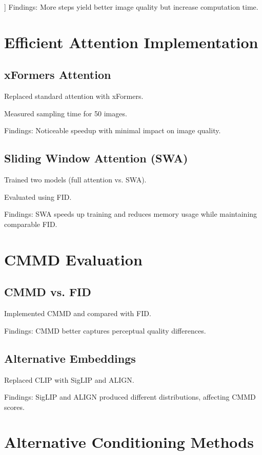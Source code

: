 \documentclass{article}
\begin{document}
]
Findings: More steps yield better image quality but increase computation time.


\section{Efficient Attention Implementation}
\subsection{xFormers Attention}

Replaced standard attention with xFormers.

Measured sampling time for 50 images.

Findings: Noticeable speedup with minimal impact on image quality.

\subsection{Sliding Window Attention (SWA)}

Trained two models (full attention vs. SWA).

Evaluated using FID.

Findings: SWA speeds up training and reduces memory usage while maintaining comparable FID.

\section{CMMD Evaluation}
\subsection{CMMD vs. FID}

Implemented CMMD and compared with FID.

Findings: CMMD better captures perceptual quality differences.

\subsection{Alternative Embeddings}

Replaced CLIP with SigLIP and ALIGN.

Findings: SigLIP and ALIGN produced different distributions, affecting CMMD scores.

\section{Alternative Conditioning Methods}
\end{document}
